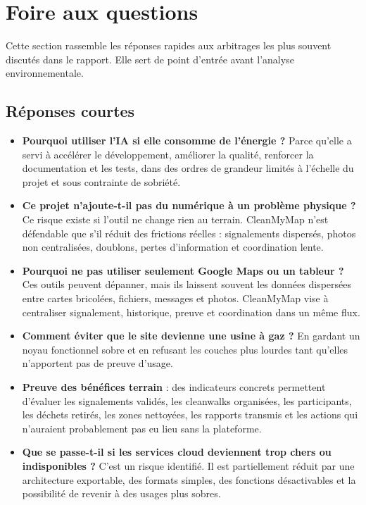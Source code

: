 \documentclass[
  10pt,
  a4paper,
  DIV=11,
  numbers=noendperiod,
  oneside]{scrreprt}
\providecommand{\tightlist}{%
  \setlength{\itemsep}{0pt}\setlength{\parskip}{0pt}}
\let\oldtextbf\textbf
\renewcommand{\textbf}[1]{\oldtextbf{\textcolor{cmmnavy}{#1}}}
\begin{document}
\chapter*{Foire aux questions}\label{foire-aux-questions}

Cette section rassemble les réponses rapides aux arbitrages les plus
souvent discutés dans le rapport. Elle sert de point d'entrée avant
l'analyse environnementale.

\section{Réponses courtes}\label{ruxe9ponses-courtes}

\begin{itemize}
\tightlist
\item
  \textbf{Pourquoi utiliser l'IA si elle consomme de l'énergie ?} Parce
  qu'elle a servi à accélérer le développement, améliorer la qualité,
  renforcer la documentation et les tests, dans des ordres de grandeur
  limités à l'échelle du projet et sous contrainte de sobriété.
\item
  \textbf{Ce projet n'ajoute-t-il pas du numérique à un problème
  physique ?} Ce risque existe si l'outil ne change rien au terrain.
  CleanMyMap n'est défendable que s'il réduit des frictions réelles :
  signalements dispersés, photos non centralisées, doublons, pertes
  d'information et coordination lente.
\item
  \textbf{Pourquoi ne pas utiliser seulement Google Maps ou un tableur
  ?} Ces outils peuvent dépanner, mais ils laissent souvent les données
  dispersées entre cartes bricolées, fichiers, messages et photos.
  CleanMyMap vise à centraliser signalement, historique, preuve et
  coordination dans un même flux.
\item
  \textbf{Comment éviter que le site devienne une usine à gaz ?} En
  gardant un noyau fonctionnel sobre et en refusant les couches plus
  lourdes tant qu'elles n'apportent pas de preuve d'usage.
\item
  \textbf{Preuve des bénéfices terrain} : des indicateurs concrets
  permettent d'évaluer les signalements validés, les cleanwalks
  organisées, les participants, les déchets retirés, les zones
  nettoyées, les rapports transmis et les actions qui n'auraient
  probablement pas eu lieu sans la plateforme.
\item
  \textbf{Que se passe-t-il si les services cloud deviennent trop chers
  ou indisponibles ?} C'est un risque identifié. Il est partiellement
  réduit par une architecture exportable, des formats simples, des
  fonctions désactivables et la possibilité de revenir à des usages plus
  sobres.
\end{itemize}
\end{document}
